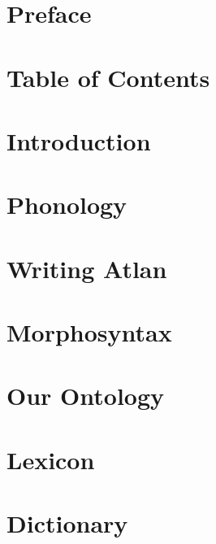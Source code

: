 \documentclass[twoside, openany, 12pt, a5paper]{book}
\begin{document}
\frontmatter


\chapter{Preface}


\chapter{Table of Contents}


\mainmatter

\chapter{Introduction}

\chapter{Phonology}

\chapter{Writing Atlan}

\chapter{Morphosyntax}

\chapter{Our Ontology}

\chapter{Lexicon}

\chapter{Dictionary}
\end{document}
